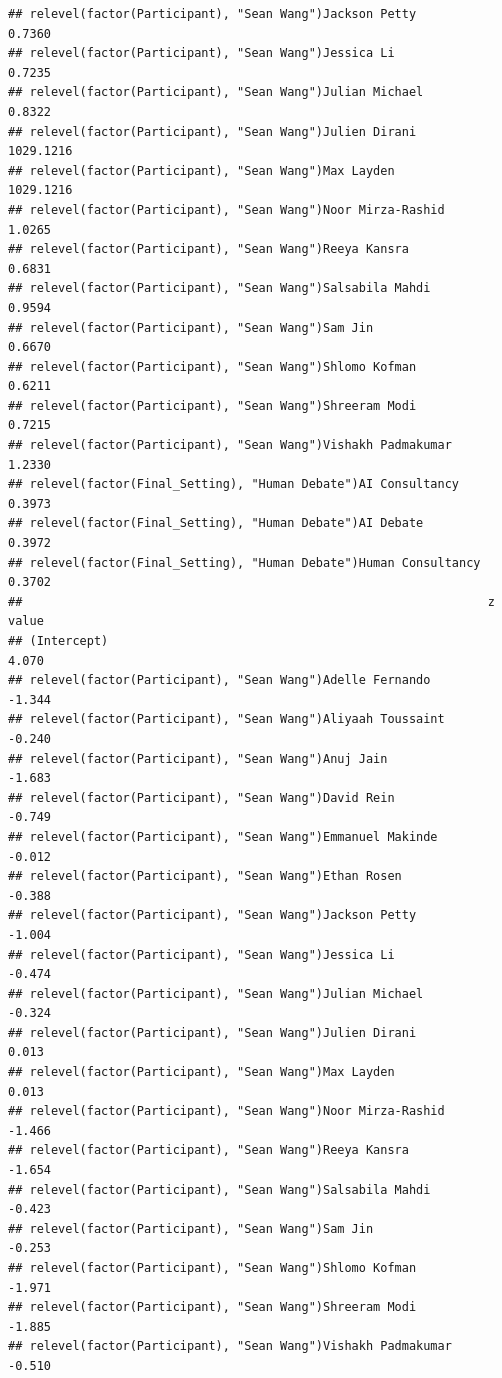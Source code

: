\documentclass[
]{article}
\begin{document}
\begin{verbatim}
## relevel(factor(Participant), "Sean Wang")Jackson Petty              0.7360
## relevel(factor(Participant), "Sean Wang")Jessica Li                 0.7235
## relevel(factor(Participant), "Sean Wang")Julian Michael             0.8322
## relevel(factor(Participant), "Sean Wang")Julien Dirani           1029.1216
## relevel(factor(Participant), "Sean Wang")Max Layden              1029.1216
## relevel(factor(Participant), "Sean Wang")Noor Mirza-Rashid          1.0265
## relevel(factor(Participant), "Sean Wang")Reeya Kansra               0.6831
## relevel(factor(Participant), "Sean Wang")Salsabila Mahdi            0.9594
## relevel(factor(Participant), "Sean Wang")Sam Jin                    0.6670
## relevel(factor(Participant), "Sean Wang")Shlomo Kofman              0.6211
## relevel(factor(Participant), "Sean Wang")Shreeram Modi              0.7215
## relevel(factor(Participant), "Sean Wang")Vishakh Padmakumar         1.2330
## relevel(factor(Final_Setting), "Human Debate")AI Consultancy        0.3973
## relevel(factor(Final_Setting), "Human Debate")AI Debate             0.3972
## relevel(factor(Final_Setting), "Human Debate")Human Consultancy     0.3702
##                                                                 z value
## (Intercept)                                                       4.070
## relevel(factor(Participant), "Sean Wang")Adelle Fernando         -1.344
## relevel(factor(Participant), "Sean Wang")Aliyaah Toussaint       -0.240
## relevel(factor(Participant), "Sean Wang")Anuj Jain               -1.683
## relevel(factor(Participant), "Sean Wang")David Rein              -0.749
## relevel(factor(Participant), "Sean Wang")Emmanuel Makinde        -0.012
## relevel(factor(Participant), "Sean Wang")Ethan Rosen             -0.388
## relevel(factor(Participant), "Sean Wang")Jackson Petty           -1.004
## relevel(factor(Participant), "Sean Wang")Jessica Li              -0.474
## relevel(factor(Participant), "Sean Wang")Julian Michael          -0.324
## relevel(factor(Participant), "Sean Wang")Julien Dirani            0.013
## relevel(factor(Participant), "Sean Wang")Max Layden               0.013
## relevel(factor(Participant), "Sean Wang")Noor Mirza-Rashid       -1.466
## relevel(factor(Participant), "Sean Wang")Reeya Kansra            -1.654
## relevel(factor(Participant), "Sean Wang")Salsabila Mahdi         -0.423
## relevel(factor(Participant), "Sean Wang")Sam Jin                 -0.253
## relevel(factor(Participant), "Sean Wang")Shlomo Kofman           -1.971
## relevel(factor(Participant), "Sean Wang")Shreeram Modi           -1.885
## relevel(factor(Participant), "Sean Wang")Vishakh Padmakumar      -0.510

\end{verbatim}
\end{document}
